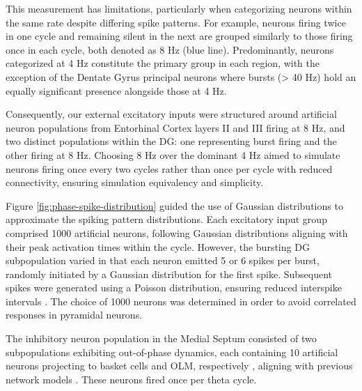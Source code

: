 \documentclass[../main.tex]{subfiles}
\begin{document}
This measurement has limitations, particularly when categorizing neurons within the same rate despite differing spike patterns.
For example, neurons firing twice in one cycle and remaining silent in the next are grouped similarly to those firing once in each cycle, both denoted as 8 Hz (blue line). 
Predominantly, neurons categorized at 4 Hz constitute the primary group in each region, with the exception of the Dentate Gyrus principal neurons where bursts (> 40 Hz) hold an equally significant presence alongside those at 4 Hz.

Consequently, our external excitatory inputs were structured around artificial neuron populations from Entorhinal Cortex layers II and III firing at 8 Hz, and two distinct populations within the DG: one representing burst firing and the other firing at 8 Hz.
Choosing 8 Hz over the dominant 4 Hz aimed to simulate neurons firing once every two cycles rather than once per cycle with reduced connectivity, ensuring simulation equivalency and simplicity.

Figure \ref{fig:phase-spike-distribution} guided the use of Gaussian distributions to approximate the spiking pattern distributions.
Each excitatory input group comprised 1000 artificial neurons, following Gaussian distributions aligning with their peak activation times within the cycle.
However, the bursting DG subpopulation varied in that each neuron emitted 5 or 6 spikes per burst, randomly initiated by a Gaussian distribution for the first spike.
Subsequent spikes were generated using a Poisson distribution, ensuring reduced interspike intervals \citep{neubrandt_single_2018}.
The choice of 1000 neurons was determined in order to avoid correlated responses in pyramidal neurons.

The inhibitory neuron population in the Medial Septum consisted of two subpopulations exhibiting out-of-phase dynamics, each containing 10 artificial neurons projecting to basket cells and OLM, respectively \citep{borhegyi_phase_2004}, aligning with previous network models \citep{cutsuridis_computational_2015}.
These neurons fired once per theta cycle.
\end{document}
